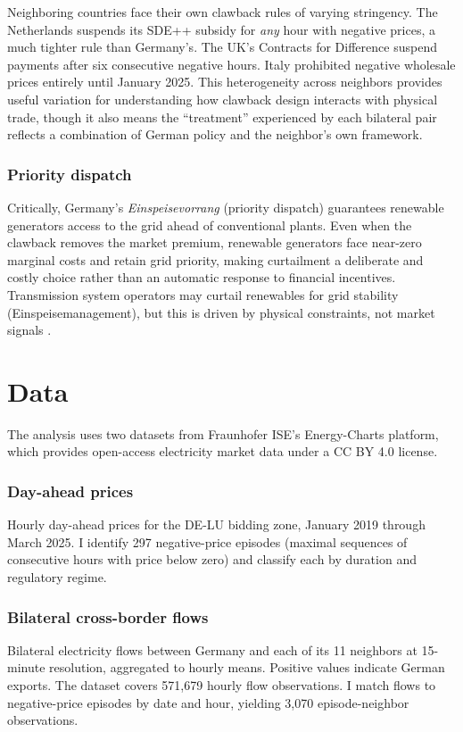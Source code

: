 \documentclass[12pt]{article}
\begin{document}
Neighboring countries face their own clawback rules of varying stringency. The Netherlands suspends its SDE++ subsidy for \textit{any} hour with negative prices, a much tighter rule than Germany's. The UK's Contracts for Difference suspend payments after six consecutive negative hours. Italy prohibited negative wholesale prices entirely until January 2025. This heterogeneity across neighbors provides useful variation for understanding how clawback design interacts with physical trade, though it also means the ``treatment'' experienced by each bilateral pair reflects a combination of German policy and the neighbor's own framework.

\subsubsection*{Priority dispatch}
Critically, Germany's \textit{Einspeisevorrang} (priority dispatch) guarantees renewable generators access to the grid ahead of conventional plants. Even when the clawback removes the market premium, renewable generators face near-zero marginal costs and retain grid priority, making curtailment a deliberate and costly choice rather than an automatic response to financial incentives. Transmission system operators may curtail renewables for grid stability (Einspeisemanagement), but this is driven by physical constraints, not market signals \citep{sensfuss2008merit}.

\section{Data}
\label{sec:data}

The analysis uses two datasets from Fraunhofer ISE's Energy-Charts platform, which provides open-access electricity market data under a CC BY 4.0 license.

\subsubsection*{Day-ahead prices}
Hourly day-ahead prices for the DE-LU bidding zone, January 2019 through March 2025. I identify 297 negative-price episodes (maximal sequences of consecutive hours with price below zero) and classify each by duration and regulatory regime.

\subsubsection*{Bilateral cross-border flows}
Bilateral electricity flows between Germany and each of its 11 neighbors at 15-minute resolution, aggregated to hourly means. Positive values indicate German exports. The dataset covers 571,679 hourly flow observations. I match flows to negative-price episodes by date and hour, yielding 3,070 episode-neighbor observations.
\end{document}
